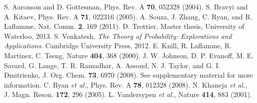 \documentclass[prl,twocolumn,showpacs,superscriptaddress]{revtex4-1}
\begin{document}
\begin{thebibliography}{99}
 S. Aaronson and D. Gottesman, Phys. Rev. A \textbf{70}, 052328 (2004).
 S. Bravyi and A. Kitaev, Phys. Rev. A \textbf{71}, 022316 (2005).
 A. Souza, J. Zhang, C. Ryan, and R. Laflamme, Nat. Comm. \textbf{2}, 169 (2011).
 D. Trottier, Master thesis, University of Waterloo, 2013.
 S. Venkatesh, \emph{The Theory of Probability: Explorations and Applications}. Cambridge University Press, 2012.
 E. Knill, R. Laflamme, R. Martinez, C. Tseng, Nature \textbf{404}, 368 (2000).
 J. W. Johnson, D. P. Evanoff, M. E. Savard, G. Lange, T. R.  Ramadhar, A. Assoud, N. J. Taylor, and G. I. Dmitrienko, J. Org. Chem. \textbf{73}, 6970 (2008).
 See supplementary material for more information.
 C. Ryan \emph{et al.}, Phys. Rev. A \textbf{78}, 012328 (2008).
 N. Khaneja \emph{et al.}, J. Magn. Reson. \textbf{172}, 296 (2005).
 L. Vandersypen \emph{et al.}, Nature \textbf{414}, 883 (2001).
\end{thebibliography}
\end{document}
